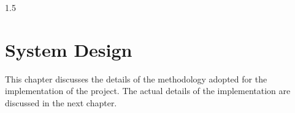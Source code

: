 
\newpage
{}
\thispagestyle{empty}
%
\begin{spacing}{1.5}
\chapter{System Design}
This chapter discusses the details of the methodology adopted for 
the implementation of the project. The actual details of the
implementation are discussed in the next chapter.
\end{spacing}
